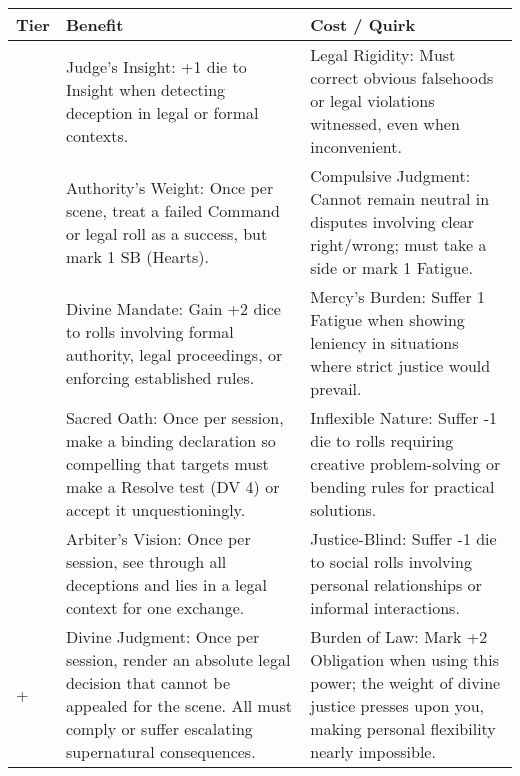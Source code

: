 \begin{longtable}{>{\raggedright\arraybackslash}p{1cm} p{5cm} p{5cm}}
\toprule
\textbf{Tier} & \textbf{Benefit} & \textbf{Cost / Quirk} \\
\midrule
1 & Judge's Insight: +1 die to Insight when detecting deception in legal or formal contexts. & Legal Rigidity: Must correct obvious falsehoods or legal violations witnessed, even when inconvenient. \\
\midrule
2 & Authority's Weight: Once per scene, treat a failed Command or legal roll as a success, but mark 1 SB (Hearts). & Compulsive Judgment: Cannot remain neutral in disputes involving clear right/wrong; must take a side or mark 1 Fatigue. \\
\midrule
3 & Divine Mandate: Gain +2 dice to rolls involving formal authority, legal proceedings, or enforcing established rules. & Mercy's Burden: Suffer 1 Fatigue when showing leniency in situations where strict justice would prevail. \\
\midrule
4 & Sacred Oath: Once per session, make a binding declaration so compelling that targets must make a Resolve test (DV 4) or accept it unquestioningly. & Inflexible Nature: Suffer -1 die to rolls requiring creative problem-solving or bending rules for practical solutions. \\
\midrule
5 & Arbiter's Vision: Once per session, see through all deceptions and lies in a legal context for one exchange. & Justice-Blind: Suffer -1 die to social rolls involving personal relationships or informal interactions. \\
\midrule
6+ & Divine Judgment: Once per session, render an absolute legal decision that cannot be appealed for the scene. All must comply or suffer escalating supernatural consequences. & Burden of Law: Mark +2 Obligation when using this power; the weight of divine justice presses upon you, making personal flexibility nearly impossible. \\
\bottomrule
\end{longtable}